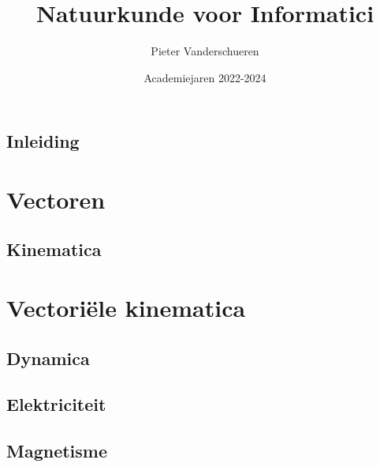 \documentclass{exam}
\title{Natuurkunde voor Informatici}
\author{Pieter Vanderschueren}
\date{Academiejaren 2022-2024}
\newcommand{\RomanNumeralCaps}[1]{\MakeUppercase{\romannumeral #1}}
\newcommand{\introPage}[1]{

    \vspace*{\fill}
    \begin{center}
        
    \section*{#1}
    \end{center}

    \vspace*{\fill}
}
\begin{document}
\begin{titlingpage}
\maketitle
\end{titlingpage}


\newpage

%
%
%
%
%

\tableofcontents

\newpage

\introPage{Inleiding}

\newpage

\section{Vectoren}

\vspace{0.5cm}



\newpage

\introPage{Kinematica}

\newpage

\section{Vectoriële kinematica}

\vspace{0.5cm}



\newpage

\introPage{Dynamica}

\newpage



\newpage

\introPage{Elektriciteit}

\newpage



\newpage

\introPage{Magnetisme}

\newpage


\end{document}
